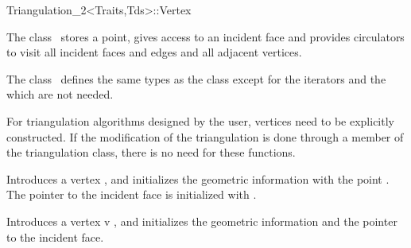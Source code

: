 

\begin{ccRefClass}{Triangulation_2<Traits,Tds>::Vertex}  %


\ccDefinition
  
The class \ccRefName\ stores a point, gives access to an incident face
and provides circulators to visit all incident faces and edges
and all adjacent vertices.





\ccTypes
The class \ccRefName\ defines the same types 
as the class  
except for the iterators and the 
 which are not needed.


\begin{ccAdvanced}
\ccCreation
{}  %
For triangulation algorithms designed by the user, vertices need to be
explicitly constructed.  If the modification of the triangulation is
done through a member of the triangulation class, there is no need for these
functions.


{Introduces a vertex \ccVar, and initializes the geometric information
with the point .
The pointer to the incident face is initialized with .}

{Introduces a vertex v \ccVar, and initializes the geometric information and 
the pointer to the incident face.}
\end{ccAdvanced}


\end{ccRefClass}
